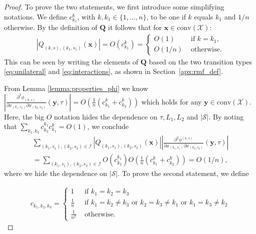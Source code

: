\documentclass[acmsmall]{acmart}
\newcommand\bx{\mathbf{x}}
\newcommand\by{\mathbf{y}}
\newcommand\bQ{\mathbf{Q}}
\newcommand\calX{\mathcal{X}}
\newcommand\calI{\mathcal{I}}
\newcommand\calS{\mathcal{S}}
\newcommand\conv[1]{\mathrm{conv}(#1)}      %
\newcommand\abs[1]{\left|#1\right|}         %
\newcommand{\dd}[3]{ \frac{\partial^2 #1 }{ \partial x_{#2} \partial x_{#3}}}
\begin{document}
\begin{proof}
To prove the two statements, we first introduce some simplifying notations. We define $c^k_{k_1}$, with $k,k_1 \in \{1,\ldots,n\}$, to be one if $k$ equals $k_1$ and $1/n$ otherwise. By the definition of $\bQ$ it follows that for $\bx\in\conv{\calX}$:
\begin{align*}
  \abs{Q_{(k,s),(k_1,s_1)}(\bx)} = O(c^{k}_{k_1}) =
  \begin{cases}
    O(1)   & \text{ if } k = k_1, \\
    O(1/n) & \text{ otherwise.}
  \end{cases} 
\end{align*}
This can be seen by writing the elements of $\bQ$ based on the two transition types \eqref{eq:unilateral} and \eqref{eq:interactions}, as shown in Section~\ref{apx:rmf_def}. 

From Lemma \ref{lemma:properties_phi} we know $\abs{\dd{\phi_{(k,s)}}{(k_1,s_1)}{(k_2,s_2)}(\by,\tau)} = O(\frac{1}{n}(c^k_{k_1} + c^k_{k_2}))$ which holds for any $\by \in \conv{\calX}$. Here, the big $O$ notation hides the dependence on $\tau, L_{1}, L_{2}$ and $\abs{\calS}$. By noting that $\sum_{k_1,k_2}c_{k_2}^{k_1}c^{k}_{k_1} = O(1)$, we conclude 
\begin{align*}
\sum_{(k_1,s_1),(k_2,s_2)\in \calI}\abs{Q_{(k_1,s_1),(k_2,s_2)}(\bx)} \abs{\frac{\partial^2 \phi^{(k,s)}}{\partial x_{(k_1,s_1)} \partial x_{(k_2,s_2)} }(\by, \tau)} \\
= \sum_{(k_1,s_1),(k_2,s_2)\in \calI} O(c^{k_1}_{k_2}) O(\frac{1}{n}(c^k_{k_1} + c^k_{k_2})) = O(1/n),
\end{align*}
where we hide the dependence on $\abs{\calS}$. \color{myorange} To prove the second statement, we define 

\begin{align*}
c_{k_1,k_2,k_3} = 
\begin{cases}
1 & \text{ if } k_1 = k_2 = k_3\\
\frac{1}{n} &   \text{ if } k_1 = k_2 \ne k_3 \text{ or } k_2 = k_3 \ne k_1 \text{ or } k_1 = k_3 \ne k_2 \\
\frac{1}{n^2} & \text{ otherwise. }
\end{cases}
\end{align*}


\end{proof}
\end{document}
